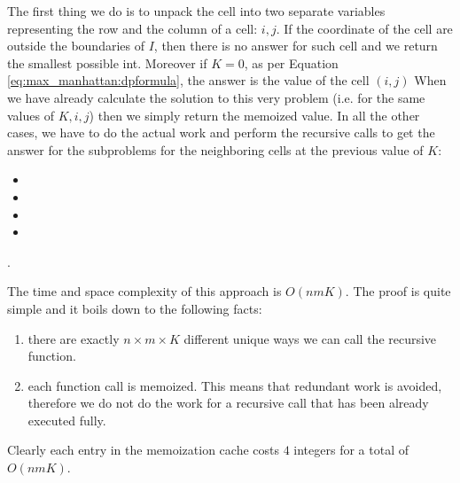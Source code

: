 The first thing we do is to unpack the cell into two separate variables representing the row and the
column of a cell: $i,j$. If the coordinate of the cell are outside the boundaries of $I$, then there
is no answer for such cell and we return the smallest possible int. Moreover if $K=0$, as per
Equation \ref{eq:max_manhattan:dpformula}, the answer is the value of the cell $(i,j)$ When we have
already calculate the solution to this very problem (i.e. for the same values of $K,i,j$) then we
simply return the memoized value. In all the other cases, we have to do the actual work and perform
the recursive calls to get the answer for the subproblems for the neighboring cells at the previous
value of $K$:
\begin{itemize}
    \item {}
    \item {}
    \item {}
    \item {} \end{itemize}.

The time and space complexity of this approach is $O(nmK)$. The proof is quite simple and it boils
down to the following facts:
\begin{enumerate}
    \item there are exactly $n\times m \times K$ different unique ways we can call the recursive
    function.
    \item each function call is memoized. This means that redundant work is avoided, therefore we do
    not do the work for a recursive call that has been already executed fully.
\end{enumerate}
Clearly each entry in the memoization cache costs $4$ integers for a total of $O(nmK)$.





